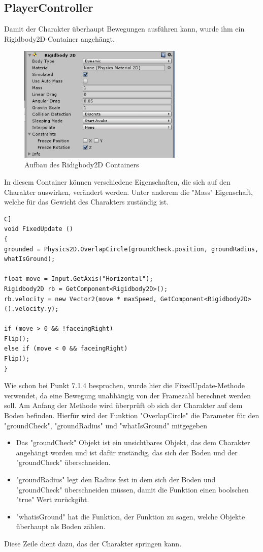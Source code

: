 \subsection{PlayerController}
Damit der Charakter überhaupt Bewegungen ausführen kann, wurde ihm ein Rigidbody2D-Container angehängt.
\begin{figure}[htbp] 
	\centering
	\includegraphics[width=0.7\textwidth]{images/Ridigbody2D.png}
	\caption{Aufbau des Ridigbody2D Containers}
\end{figure}
In diesem Container können verschiedene Eigenschaften, die sich auf den Charakter auswirken, verändert werden. Unter anderem die "Mass" Eigenschaft, welche für das Gewicht des Charakters zuständig ist.

\begin{lstlisting}[language=[Sharp]C]
void FixedUpdate ()
{
grounded = Physics2D.OverlapCircle(groundCheck.position, groundRadius, whatIsGround);

float move = Input.GetAxis("Horizontal");
Rigidbody2D rb = GetComponent<Rigidbody2D>();
rb.velocity = new Vector2(move * maxSpeed, GetComponent<Rigidbody2D>().velocity.y);

if (move > 0 && !faceingRight)
Flip();
else if (move < 0 && faceingRight)
Flip();
}
\end{lstlisting}

Wie schon bei Punkt 7.1.4 besprochen, wurde hier die FixedUpdate-Methode verwendet, da eine Bewegung unabhängig von der Framezahl berechnet werden soll. Am Anfang der Methode wird überprüft ob sich der Charakter auf dem Boden befinden. Hierfür wird der Funktion "OverlapCircle" die Parameter für den "groundCheck", "groundRadius" und "whatIsGround" mitgegeben
\begin{itemize}
	\item Das "groundCheck" Objekt ist ein unsichtbares Objekt, das dem Charakter angehängt worden und ist dafür zuständig, das sich der Boden und der "groundCheck" überschneiden.
	\item "groundRadius" legt den Radius fest in dem sich der Boden und "groundCheck" überschneiden müssen, damit die Funktion einen boolschen "true" Wert zurückgibt.
	\item "whatisGround" hat die Funktion, der Funktion zu sagen, welche Objekte überhaupt als Boden zählen.
\end{itemize}
Diese Zeile dient dazu, das der Charakter springen kann.

